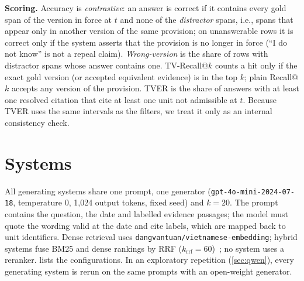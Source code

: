 \documentclass[sigconf,anonymous,review]{acmart}
\begin{document}
\textbf{Scoring.} Accuracy is \emph{contrastive}: an answer is correct if it contains every gold span of the version in force at $t$ and none of the \emph{distractor} spans, i.e., spans that appear only in another version of the same provision; on unanswerable rows it is correct only if the system asserts that the provision is no longer in force (``I do not know'' is not a repeal claim). \emph{Wrong-version} is the share of rows with distractor spans whose answer contains one. TV-Recall@$k$ counts a hit only if the exact gold version (or accepted equivalent evidence) is in the top $k$; plain Recall@$k$ accepts any version of the provision. TVER is the share of answers with at least one resolved citation that cite at least one unit not admissible at $t$. Because TVER uses the same intervals as the filters, we treat it only as an internal consistency check.

\section{Systems}
\label{sec:systems}

All generating systems share one prompt, one generator (\nolinkurl{gpt-4o-mini-2024-07-18}, temperature 0, 1{,}024 output tokens, fixed seed) and $k=20$. The prompt contains the question, the date and labelled evidence passages; the model must quote the wording valid at the date and cite labels, which are mapped back to unit identifiers. Dense retrieval uses \nolinkurl{dangvantuan/vietnamese-embedding}; hybrid systems fuse BM25 and dense rankings by RRF ($k_{\mathrm{rrf}}=60$)~\cite{cormack2009rrf}; no system uses a reranker.  lists the configurations. In an exploratory repetition (\cref{sec:qwen}), every generating system is rerun on the same prompts with an open-weight generator.
\end{document}

